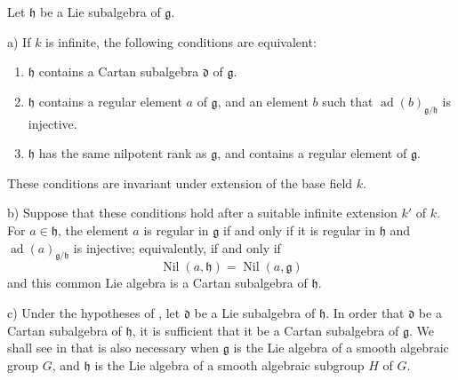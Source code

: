 \begin{proposition}
Let \(\mathfrak h\) be a Lie subalgebra of \(\mathfrak g\).

\textup{a)} If \(k\) is infinite, the following conditions are
equivalent:
\begin{enumerate}
\item[(i)]
\(\mathfrak h\) contains a Cartan subalgebra \(\mathfrak d\) of
\(\mathfrak g\).
\item[(ii)]
\(\mathfrak h\) contains a regular element \(a\) of \(\mathfrak g\),
and an element \(b\) such that
\(\operatorname{ad}(b)_{\mathfrak g/\mathfrak h}\) is injective.
\item[(iii)]
\(\mathfrak h\) has the same nilpotent rank as \(\mathfrak g\), and
contains a regular element of \(\mathfrak g\).
\end{enumerate}
These conditions are invariant under extension of the base field
\(k\).

\textup{b)} Suppose that these conditions hold after a suitable
infinite extension \(k'\) of \(k\). For \(a\in\mathfrak h\), the
element \(a\) is regular in \(\mathfrak g\) if and only if it is
regular in \(\mathfrak h\) and
\(\operatorname{ad}(a)_{\mathfrak g/\mathfrak h}\) is injective;
equivalently, if and only if
\[
  \operatorname{Nil}(a,\mathfrak h)
  =
  \operatorname{Nil}(a,\mathfrak g)
\]
and this common Lie algebra is a Cartan subalgebra of
\(\mathfrak h\).

\textup{c)} Under the hypotheses of , let \(\mathfrak d\) be a Lie
subalgebra of \(\mathfrak h\). In order that \(\mathfrak d\) be a
Cartan subalgebra of \(\mathfrak h\), it is sufficient that it be a
Cartan subalgebra of \(\mathfrak g\). We shall see in  that  is also necessary when \(\mathfrak g\) is the Lie algebra
of a smooth algebraic group \(G\), and \(\mathfrak h\) is the Lie
algebra of a smooth algebraic subgroup \(H\) of \(G\).
\end{proposition}


